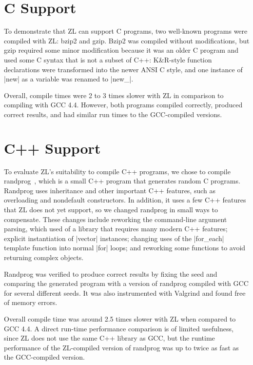 \section{C Support}

To demonstrate that ZL can support C programs, two well-known programs
were compiled with ZL: bzip2 and gzip.  Bzip2 was compiled without
modifications, but gzip required some minor modification because it was
an older C program and used some C syntax that is not a subset of C++:
K\&R-style function declarations were transformed into the newer ANSI C
style, and one instance of |new| as a variable was renamed to |new_|.

Overall, compile times were 2 to 3 times slower with ZL in comparison
to compiling with GCC 4.4.  However, both programs compiled correctly,
produced correct results, and had similar run times to the
GCC-compiled versions.

\section{C++ Support}
\label{c++-support}

To evaluate ZL's suitability to compile C++ programs, we chose to
compile randprog~\cite{randprog}, which is a small C++ program that
generates random C programs.  Randprog uses inheritance and other
important C++ features, such as overloading and nondefault
constructors.  In addition, it uses a few C++ features that ZL does not
yet support, so we changed randprog in small ways to compensate.  These
changes include reworking the command-line argument parsing, which
used of a library that requires many modern C++ features; explicit
instantiation of |vector| instances; changing uses of the |for_each|
template function into normal |for| loops; and reworking some functions
to avoid returning complex objects.

Randprog was verified to produce correct results by fixing the seed
and comparing the generated program with a version of randprog
compiled with GCC for several different seeds.  It was also
instrumented with Valgrind and found free of memory errors.

Overall compile time was around 2.5 times slower with ZL when compared to
GCC 4.4.  A direct run-time performance comparison is of limited
usefulness, since ZL does not use the same C++ library as GCC, but the
runtime performance of the ZL-compiled version of randprog was up to
twice as fast as the GCC-compiled version.

